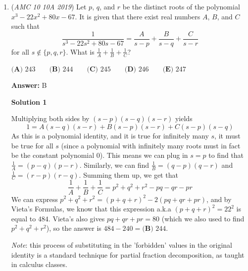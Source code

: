 \begin{enumerate}
Tadd first starts with a number, says 4 numbers after, then 7, etc.

 Notice how the difference between each one is 3, and therefore the total numbers said on each iteration would be $3x - 1$. Obviouisly, $2019$ is unobtainable from the sum of the first $n$ numbers, so at most, we want another number that is an iteration of $3x$. Therefore we want a number that satisfies both \( 2019 \mod 3 \equiv 0 \) and \( x \mod 3 \equiv 0 \).

 The only number that works is $\boxed{\textbf{(C) }5979}$

 \textbf{Note} The statement that says that the max number is 10000 is pretty much useless. You can just ignore it, as it has no effect on the problem.

 


	\item (\textit{AMC 10 10A 2019}) Let $p$, $q$, and $r$ be the distinct roots of the polynomial $x^3 - 22x^2 + 80x - 67$. It is given that there exist real numbers $A$, $B$, and $C$ such that 
 \[\dfrac{1}{s^3 - 22s^2 + 80s - 67} = \dfrac{A}{s-p} + \dfrac{B}{s-q} + \frac{C}{s-r}\]for all $s\not\in\{p,q,r\}$. What is $\frac1A+\frac1B+\frac1C$?


 $\textbf{(A) }243\qquad\textbf{(B) }244\qquad\textbf{(C) }245\qquad\textbf{(D) }246\qquad\textbf{(E) } 247$

 \textbf{Answer: }B



\textbf{Solution 1}

Multiplying both sides by $(s-p)(s-q)(s-r)$ yields
 \[1 = A(s-q)(s-r) + B(s-p)(s-r) + C(s-p)(s-q)\]As this is a polynomial identity, and it is true for infinitely many $s$, it must be true for all $s$ (since a polynomial with infinitely many roots must in fact be the constant polynomial $0$). This means we can plug in $s = p$ to find that $\frac1A = (p-q)(p-r)$.  Similarly, we can find $\frac1B = (q-p)(q-r)$ and $\frac1C = (r-p)(r-q)$.  Summing them up, we get that 
 \[\frac1A + \frac1B + \frac1C = p^2 + q^2 + r^2 - pq - qr - pr\]We can express $p^2 + q^2 + r^2 = (p+q+r)^2 - 2(pq + qr + pr)$, and by Vieta's Formulas, we know that this expression a.k.a $(p+q+r)^2 = 22^2$ is equal to $484$. Vieta's also gives $pq + qr + pr = 80$ (which we also used to find $p^2+q^2+r^2$), so the answer is $484 -240 = \boxed{\textbf{(B) } 244}$. 

 \textit{Note}: this process of substituting in the 'forbidden' values in the original identity is a standard technique for partial fraction decomposition, as taught in calculus classes.  


\end{enumerate}
